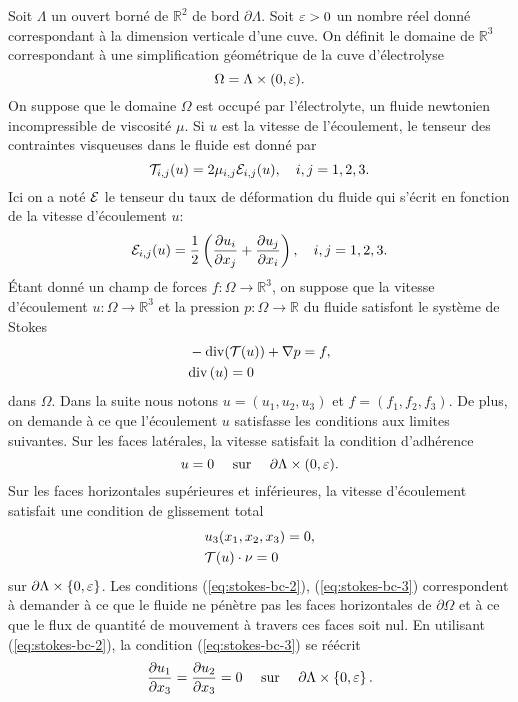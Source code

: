 Soit $\Lambda$ un ouvert borné de $\mathbb R^2$ de bord
$\partial\Lambda$. Soit $\varepsilon > 0$ un nombre réel donné
correspondant à la dimension verticale d'une cuve. On définit le
domaine de $\mathbb R^3$ correspondant à une simplification
géométrique de la cuve d'électrolyse
\begin{equation}
  \Omega = \Lambda \times (0,\varepsilon).
\end{equation}
On suppose que le domaine $\Omega$ est occupé par l'électrolyte, un
fluide newtonien incompressible de viscosité $\mu$. Si $u$ est la
vitesse de l'écoulement, le tenseur des contraintes visqueuses dans le
fluide \cite{Landau1987} est donné par
\begin{equation}
  \mathcal T_{i,j}(u) = 2\mu_{i,j}
  \mathcal E_{i,j}(u),\quad i,j = 1,2,3.
\end{equation}
Ici on a noté $\mathcal E$ le tenseur du taux de déformation du fluide qui s'écrit
en fonction de la vitesse d'écoulement $u$:
\begin{equation}
  \mathcal E_{i,j}(u) = \frac{1}{2}\left( \frac{\partial u_i}{\partial x_j} + \frac{\partial u_j}{\partial x_i} \right),\quad i,j = 1,2,3.
\end{equation}
Étant donné un champ de forces $f:\Omega\to \mathbb R^3$, on suppose
que la vitesse d'écoulement $u:\Omega \to \mathbb R^3$ et la pression
$p:\Omega \to \mathbb R$ du fluide satisfont le système de Stokes
\begin{align}
  &- \mathrm{div}(\mathcal T(u)) + \nabla p = f,\label{eq:stokes-u}\\
  &\mathrm{div} \left( u \right) = 0\label{eq:stokes-p}
\end{align}
dans $\Omega$. Dans la suite nous notons $u = (u_1, u_2, u_3)$ et $f =
(f_1, f_2, f_3)$. De plus, on demande à ce que l'écoulement $u$ satisfasse
les conditions aux limites suivantes. Sur les faces latérales, la
vitesse satisfait la condition d'adhérence
\begin{equation}
  u = 0\quad \text{ sur } \quad\partial \Lambda\times(0,\varepsilon).\label{eq:stokes-bc-1}
\end{equation}
Sur les faces horizontales supérieures et inférieures, la vitesse
d'écoulement satisfait une condition de glissement total
\begin{align}
  &u_3(x_1, x_2, x_3) = 0,\label{eq:stokes-bc-2}\\
  &\mathcal T(u)\cdot \nu = 0\label{eq:stokes-bc-3}
\end{align}
sur $\partial \Lambda \times\left\{ 0,\varepsilon \right\}$.
Les conditions (\ref{eq:stokes-bc-2}), (\ref{eq:stokes-bc-3})
correspondent à demander à ce que le fluide ne pénètre pas les faces
horizontales de $\partial\Omega$ et à ce que le flux de quantité de
mouvement à travers ces faces soit nul. En utilisant
(\ref{eq:stokes-bc-2}), la condition (\ref{eq:stokes-bc-3}) se réécrit
\begin{equation}
\frac{\partial u_1}{\partial x_3}
  = \frac{\partial u_2}{\partial x_3}
  = 0\quad \text{ sur }\quad\partial \Lambda \times\left\{ 0,\varepsilon \right\}.
\end{equation}

